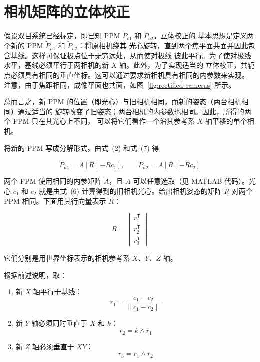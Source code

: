 
\section{相机矩阵的立体校正}
\label{sec:rectification-camera-matrices}

假设双目系统已经标定，即已知 PPM $\widetilde{P}_{o1}$ 和 $\widetilde{P}_{o2}$。立体校正的
基本思想是定义两个新的 PPM $\widetilde{P}_{n1}$ 和 $\widetilde{P}_{n2}$：将原相机绕其
光心旋转，直到两个焦平面共面并因此包含基线。这样可保证极点位于无穷远处，从而使对极线
彼此平行。为了使对极线水平，基线必须平行于两相机的新 $X$ 轴。此外，为了实现适当的
立体校正，共轭点必须具有相同的垂直坐标。这可以通过要求新相机具有相同的内参数来实现。
注意，由于焦距相同，成像平面也共面，如图~\ref{fig:rectified-cameras} 所示。

总而言之，新 PPM 的位置（即光心）与旧相机相同，而新的姿态（两台相机相同）通过适当的
旋转改变了旧姿态；两台相机的内参数也相同。因此，所得的两个 PPM 只在其光心上不同，
可以将它们看作一个沿其参考系 $X$ 轴平移的单个相机。

将新的 PPM 写成分解形式。由式~(2) 和式~(7) 得

\begin{equation}
  \widetilde{P}_{n1}=A[R\mid-Rc_1],\qquad
  \widetilde{P}_{n2}=A[R\mid-Rc_2]
  \label{eq:new-ppms}
\end{equation}

两个 PPM 使用相同的内参矩阵 $A$，且 $A$ 可以任意选取（见 MATLAB 代码）。光心 $c_1$
和 $c_2$ 就是由式~(6) 计算得到的旧相机光心。给出相机姿态的矩阵 $R$ 对两个 PPM
相同。下面用其行向量表示 $R$：

\begin{equation}
  R=\begin{bmatrix}r_1^{\mathsf T}\\r_2^{\mathsf T}\\r_3^{\mathsf T}\end{bmatrix}
  \label{eq:new-rotation-rows}
\end{equation}

它们分别是用世界坐标表示的相机参考系 $X$、$Y$、$Z$ 轴。

根据前述说明，取：

\begin{enumerate}
  \item 新 $X$ 轴平行于基线：
    \begin{equation*}
      r_1=\frac{c_1-c_2}{\lVert c_1-c_2\rVert}
    \end{equation*}
  \item 新 $Y$ 轴必须同时垂直于 $X$ 和 $k$：
    \begin{equation*}
      r_2=k\wedge r_1
    \end{equation*}
  \item 新 $Z$ 轴必须垂直于 $XY$：
    \begin{equation*}
      r_3=r_1\wedge r_2
    \end{equation*}
\end{enumerate}

